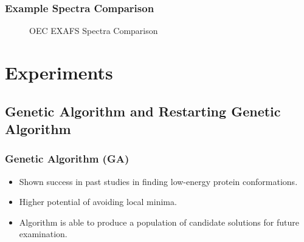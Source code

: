 \documentclass[10pt]{beamer}
\begin{document}
\begin{frame}
	\frametitle{Example Spectra Comparison}

	\begin{figure}
		\caption{OEC EXAFS Spectra Comparison}
	\end{figure}

\end{frame}

\section{Experiments}

\subsection{Genetic Algorithm and Restarting Genetic Algorithm}

\begin{frame}
	\frametitle{Genetic Algorithm (GA)}

	\begin{itemize}
		\item Shown success in past studies in finding low-energy protein conformations.
		\item Higher potential of avoiding local minima.
		\item Algorithm is able to produce a population of candidate solutions for future examination.
	\end{itemize}

\end{frame}
\end{document}
